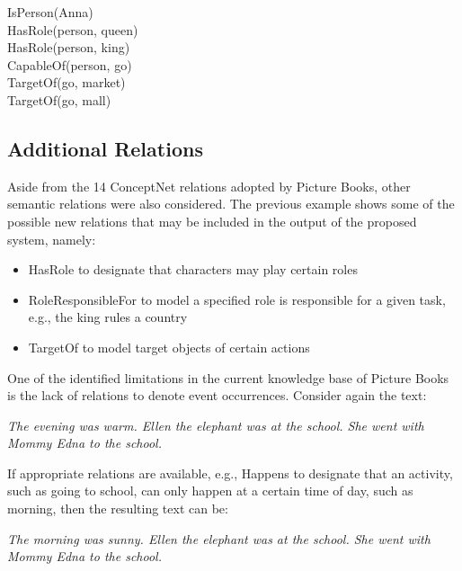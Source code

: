 \noindent
	\hspace{1 in}IsPerson(Anna) \\
	\hspace*{1 in}HasRole(person, queen) \\
	\hspace*{1 in}HasRole(person, king) \\
	\hspace*{1 in}CapableOf(person, go) \\
	\hspace*{1 in}TargetOf(go, market) \\
	\hspace*{1 in}TargetOf(go, mall)
	
\subsection{Additional Relations}
\label{sec:addrelations}
	
Aside from the 14 ConceptNet relations adopted by Picture Books, other semantic relations were also considered. The previous example shows some of the possible new relations that may be included in the output of the proposed system, namely:

\begin{itemize}
	\item HasRole to designate that characters may play certain roles
	\item RoleResponsibleFor to model a specified role is responsible for a given task, e.g., the king rules a country
	\item TargetOf to model target objects of certain actions
\end{itemize}

One of the identified limitations in the current knowledge base of Picture Books is the lack of relations to denote event occurrences. Consider again the text:
	
	\noindent
	\hspace{1 in}\emph{The evening was warm. Ellen the elephant was at the school. She went with Mommy Edna to the school.}
	
	If appropriate relations are available, e.g., Happens to designate that an activity, such as going to school, can only happen at a certain time of day, such as morning, then the resulting text can be:
	
	\noindent
	\hspace{1 in}\emph{The morning was sunny. Ellen the elephant was at the school. She went with Mommy Edna to the school.}
	
